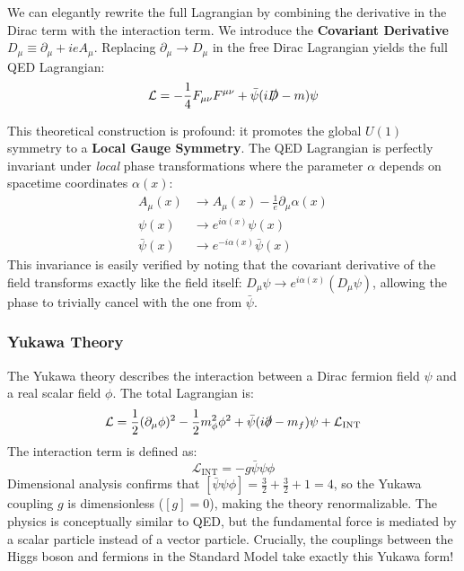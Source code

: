 We can elegantly rewrite the full Lagrangian by combining the derivative in the Dirac term with the interaction term. We introduce the \textbf{Covariant Derivative} \(D_\mu \equiv \partial_\mu + ieA_\mu\). Replacing \(\partial_\mu \to D_\mu\) in the free Dirac Lagrangian yields the full QED Lagrangian:
\[
    \mathcal{L} = -\frac{1}{4}F_{\mu\nu}F^{\mu\nu} + \bar{\psi}(i\slashed{D} - m)\psi
\]
\begin{remark}
    This theoretical construction is profound: it promotes the global \(U(1)\) symmetry to a \textbf{Local Gauge Symmetry}. The QED Lagrangian is perfectly invariant under \textit{local} phase transformations where the parameter \(\alpha\) depends on spacetime coordinates \(\alpha(x)\):
    \begin{align*}
        A_\mu(x)      & \to A_\mu(x) - \frac{1}{e}\partial_\mu \alpha(x) \\
        \psi(x)       & \to e^{i\alpha(x)}\psi(x)                        \\
        \bar{\psi}(x) & \to e^{-i\alpha(x)}\bar{\psi}(x)
    \end{align*}
    This invariance is easily verified by noting that the covariant derivative of the field transforms exactly like the field itself: \(D_\mu \psi \to e^{i\alpha(x)} (D_\mu \psi)\), allowing the phase to trivially cancel with the one from \(\bar{\psi}\).
\end{remark}

\subsubsection{Yukawa Theory}

The Yukawa theory describes the interaction between a Dirac fermion field \(\psi\) and a real scalar field \(\phi\). The total Lagrangian is:
\[
    \mathcal{L} = \frac{1}{2}(\partial_\mu \phi)^2 - \frac{1}{2}m_\phi^2 \phi^2 + \bar{\psi}(i\slashed{\partial} - m_f)\psi + \mathcal{L}_{\text{INT}}
\]
The interaction term is defined as:
\[
    \mathcal{L}_{\text{INT}} = -g \bar{\psi}\psi\phi
\]
Dimensional analysis confirms that \([\bar{\psi}\psi\phi] = \frac{3}{2} + \frac{3}{2} + 1 = 4\), so the Yukawa coupling \(g\) is dimensionless (\([g] = 0\)), making the theory renormalizable. The physics is conceptually similar to QED, but the fundamental force is mediated by a scalar particle instead of a vector particle. Crucially, the couplings between the Higgs boson and fermions in the Standard Model take exactly this Yukawa form!

